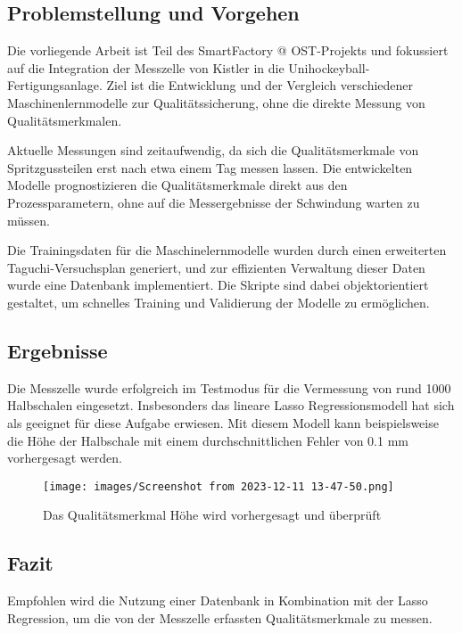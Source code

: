 \subsection*{Problemstellung und Vorgehen}
Die vorliegende Arbeit ist Teil des SmartFactory @ OST-Projekts und fokussiert auf die Integration der Messzelle von Kistler in die Unihockeyball- Fertigungsanlage. Ziel ist die Entwicklung und der Vergleich verschiedener Maschinenlernmodelle zur Qualitätssicherung, ohne die direkte Messung von Qualitätsmerkmalen.

Aktuelle Messungen sind zeitaufwendig, da sich die Qualitätsmerkmale von Spritzgussteilen erst nach etwa einem Tag messen lassen. Die entwickelten Modelle prognostizieren die Qualitätsmerkmale direkt aus den Prozessparametern, ohne auf die Messergebnisse der Schwindung warten zu müssen.

Die Trainingsdaten für die Maschinelernmodelle wurden durch einen erweiterten Taguchi-Versuchsplan generiert, und zur effizienten Verwaltung dieser Daten wurde eine Datenbank implementiert. Die Skripte sind dabei objektorientiert gestaltet, um schnelles Training und Validierung der Modelle zu ermöglichen.

\subsection*{Ergebnisse}
Die Messzelle wurde erfolgreich im Testmodus für die Vermessung von rund 1000 Halbschalen eingesetzt. Insbesonders das lineare Lasso Regressionsmodell hat sich als geeignet für diese Aufgabe erwiesen. Mit diesem Modell kann beispielsweise die Höhe der Halbschale mit einem durchschnittlichen Fehler von 0.1 mm vorhergesagt werden.


\begin{figure}[!h]
  
\texttt{[image: images/Screenshot from 2023-12-11 13-47-50.png]}
\caption{Das Qualitätsmerkmal Höhe wird vorhergesagt und überprüft}
\label{fig:AbsFig}
\end{figure}



\subsection*{Fazit}
Empfohlen wird die Nutzung einer Datenbank in Kombination mit der Lasso Regression, um die von der Messzelle erfassten Qualitätsmerkmale zu messen.

\newpage
